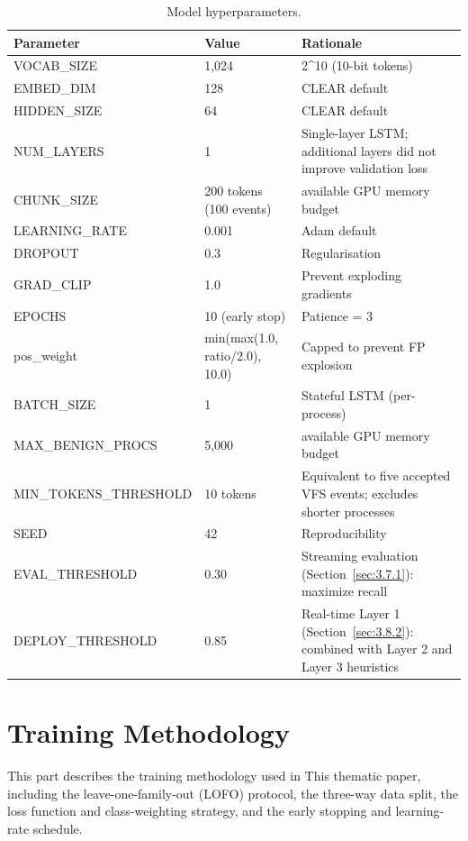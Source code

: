 \begin{table}[htbp]
\centering
\small
\caption{Model hyperparameters.}\label{tab:3-6}
\begin{tabularx}{\textwidth}{lXX}
\hline
\textbf{Parameter} & \textbf{Value} & \textbf{Rationale} \\
\hline
VOCAB\_\allowbreak{}SIZE & 1,024 & 2\textasciicircum{}10 (10-bit tokens) \\
EMBED\_\allowbreak{}DIM & 128 & CLEAR default \\
HIDDEN\_\allowbreak{}SIZE & 64 & CLEAR default \\
NUM\_\allowbreak{}LAYERS & 1 & Single-layer LSTM; additional layers did not improve validation loss \\
CHUNK\_\allowbreak{}SIZE & 200 tokens (100 events) & available GPU memory budget \\
LEARNING\_\allowbreak{}RATE & 0.001 & Adam default \\
DROPOUT & 0.3 & Regularisation \\
GRAD\_\allowbreak{}CLIP & 1.0 & Prevent exploding gradients \\
EPOCHS & 10 (early stop) & Patience = 3 \\
pos\_\allowbreak{}weight & min(max(1.0, ratio/\allowbreak{}2.0), 10.0) & Capped to prevent FP explosion \\
BATCH\_\allowbreak{}SIZE & 1 & Stateful \textmu{}LSTM (per-process) \\
MAX\_\allowbreak{}BENIGN\_\allowbreak{}PROCS & 5,000 & available GPU memory budget \\
MIN\_\allowbreak{}TOKENS\_\allowbreak{}THRESHOLD & 10 tokens & Equivalent to five accepted VFS events; excludes shorter processes \\
SEED & 42 & Reproducibility \\
EVAL\_\allowbreak{}THRESHOLD & 0.30 & Streaming evaluation (Section~\ref{sec:3.7.1}): maximize recall \\
DEPLOY\_\allowbreak{}THRESHOLD & 0.85 & Real-time Layer 1 (Section~\ref{sec:3.8.2}): combined with Layer 2 and Layer 3 heuristics \\
\hline
\end{tabularx}
\end{table}

\section{Training Methodology}\label{sec:3.6}

This part describes the training methodology used in This thematic paper, including the leave-one-family-out (LOFO) protocol, the three-way data split, the loss function and class-weighting strategy, and the early stopping and learning-rate schedule.

